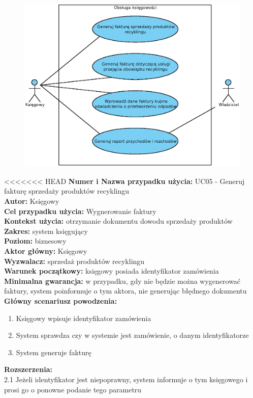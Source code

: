 \begin{figure}[H]
	\centering
	\includegraphics[width=.8\textwidth]{img/UC/ksiegowosc.eps}
\end{figure}

<<<<<<< HEAD
\textbf{Numer i Nazwa przypadku użycia:} UC05 - Generuj fakturę sprzedaży produktów recyklingu \\
\textbf{Autor:} Księgowy\\
\textbf{Cel przypadku użycia:} Wygnerowanie faktury \\
\textbf{Kontekst użycia:} otrzymanie dokumentu dowodu sprzedaży produktów  \\
\textbf{Zakres:} system księgujący \\
\textbf{Poziom:} biznesowy \\
\textbf{Aktor główny:} Księgowy \\
\textbf{Wyzwalacz:} sprzedaż produktów recyklingu \\
\textbf{Warunek początkowy:} księgowy posiada identyfikator zamówienia \\
\textbf{Minimalna gwarancja:} w przypadku, gdy nie będzie można wygenerować faktury, system poinformuje o tym aktora, nie generując błędnego dokumentu \\
\textbf{Główny scenariusz powodzenia:} 
	\begin{enumerate}
		\item Księgowy wpisuje identyfikator zamówienia
		\item System sprawdza czy w systemie jest zamówienie, o danym identyfikatorze
		\item System generuje fakturę 
	\end{enumerate}
\textbf{Rozszerzenia:} \\
2.1 Jeżeli identyfikator jest niepoprawny, system informuje o tym księgowego i prosi go o ponowne podanie tego parametru

